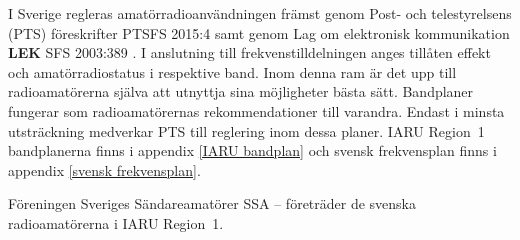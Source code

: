 I Sverige regleras amatörradioanvändningen främst genom Post- och
telestyrelsens (PTS) föreskrifter PTSFS 2015:4 \cite{PTSFS2015:4} samt genom Lag
om elektronisk kommunikation \textbf{LEK} SFS 2003:389 \cite{SFS2003:389}.
I anslutning till frekvenstilldelningen anges tillåten effekt och
amatörradiostatus i respektive band.
Inom denna ram är det upp till radioamatörerna själva att utnyttja sina
möjligheter bästa sätt.
Bandplaner fungerar som radioamatörernas rekommendationer till varandra.
Endast i minsta utsträckning medverkar PTS till reglering inom dessa planer.
IARU Region~1 bandplanerna finns i appendix \ref{IARU bandplan} och svensk
frekvensplan finns i appendix \ref{svensk frekvensplan}.

Föreningen Sveriges Sändareamatörer SSA -- företräder de svenska
radioamatörerna i IARU Region~1.
